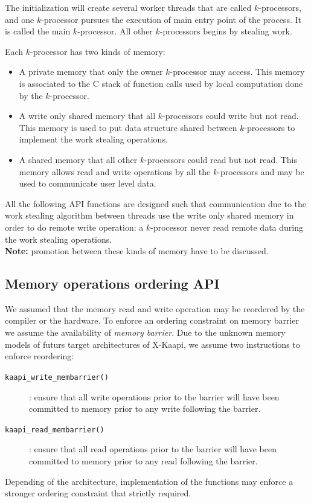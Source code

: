 \documentclass[12pt]{report}
\newcommand{\kaapi}{\textsc{X}-Kaapi\xspace}
\begin{document}
The initialization will create several worker threads that are called $k$-processors, and one $k$-processor pursues  the execution of main entry point of the process. It is called the main $k$-processor. All other $k$-processors begins by stealing work.

Each $k$-processor has two kinds of memory:
\begin{itemize}
\item A private memory that only the owner $k$-processor may access. This memory is associated to the C stack of function calls used by local computation done by the $k$-processor.
\item A write only shared memory that all $k$-processors could write but not read. This memory is used to put data structure shared between $k$-processors to implement the work stealing operations.
\item A shared memory that all other $k$-processors could read but not read. This memory allows read and write operations by all the $k$-processors and may be used to communicate user level data.
\end{itemize}
All the following API functions are designed such that communication due to the work stealing algorithm between threads use the write only shared memory in order to do remote write operation: a $k$-processor never read remote data during the work stealing operations.\\

\noindent\textbf{Note:} promotion between these kinds of memory have to be discussed.\\

\subsection{Memory operations ordering API}
We assumed that the memory read and write operation may be reordered by the compiler or the hardware. To enforce an ordering constraint on memory barrier we assume the availability of \textit{memory barrier}. Due to the unknown memory models of futurs target architectures of \kaapi, we assume two instructions to enforce reordering:
\begin{description}
\item [\texttt{kaapi\_write\_membarrier()}]: ensure that all  write operations prior to the barrier will have been committed to memory prior to any write following the barrier.
\item [\texttt{kaapi\_read\_membarrier()}]: ensure that all  read operations prior to the barrier will have been committed to memory prior to any read following the barrier.
\end{description}
Depending of the architecture, implementation of the functions may enforce a stronger ordering constraint that strictly required.
\end{document}
